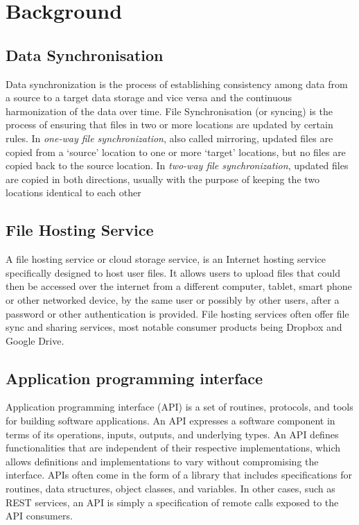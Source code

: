 
\chapter{Background}

\section{Data Synchronisation}
  Data synchronization is the process of establishing consistency among data from a source to a target data storage and vice versa and the continuous harmonization of the data over time.
  File Synchronisation (or syncing) is the process of ensuring that files in two or more locations are updated by certain rules. In \emph{one-way file synchronization}, also called mirroring, updated files are copied from a `source' location to one or more `target' locations, but no files are copied back to the source location. In \emph{two-way file synchronization}, updated files are copied in both directions, usually with the purpose of keeping the two locations identical to each other


\section{File Hosting Service}
  A file hosting service\cite{wiki-file-hosting} or cloud storage service, is an Internet hosting service specifically designed to host user files. It allows users to upload files that could then be accessed over the internet from a different computer, tablet, smart phone or other networked device, by the same user or possibly by other users, after a password or other authentication is provided. File hosting services often offer file sync and sharing services, most notable consumer products being Dropbox and Google Drive.


\section{Application programming interface}
  Application programming interface (API) is a set of routines, protocols, and tools for building software applications. An API expresses a software component in terms of its operations, inputs, outputs, and underlying types. An API defines functionalities that are independent of their respective implementations, which allows definitions and implementations to vary without compromising the interface. APIs often come in the form of a library that includes specifications for routines, data structures, object classes, and variables. In other cases, such as REST services, an API is simply a specification of remote calls exposed to the API consumers.

